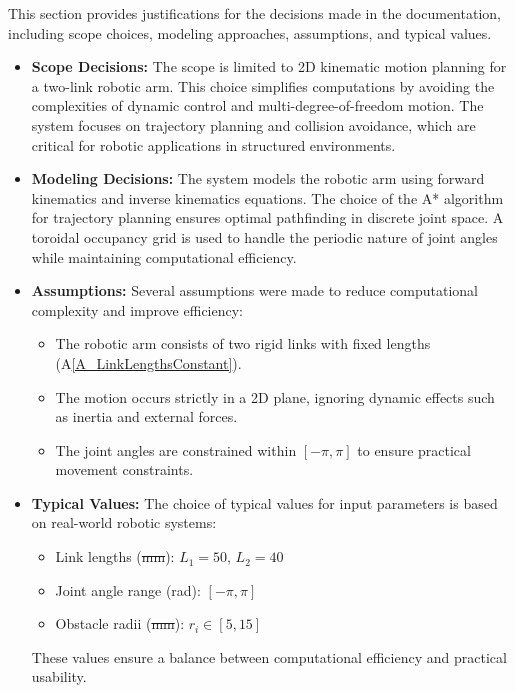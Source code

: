 \documentclass[12pt]{article}
\makeatletter
\newcommand{\aref}[1]{A\ref{#1}}
\providecommand{\DIFaddtex}[1]{{\protect\color{blue}\uwave{#1}}} %
\providecommand{\DIFdeltex}[1]{{\protect\color{red}\sout{#1}}} %
\providecommand{\DIFaddbegin}{} %
\providecommand{\DIFaddend}{} %
\providecommand{\DIFdelbegin}{} %
\providecommand{\DIFdelend}{} %
\providecommand{\DIFadd}[1]{\texorpdfstring{\DIFaddtex{#1}}{#1}} %
\providecommand{\DIFdel}[1]{\texorpdfstring{\DIFdeltex{#1}}{}} %
\newcommand{\DIFscaledelfig}{0.5}
\newlength{\DIFdelgraphicswidth} %
\newlength{\DIFdelgraphicsheight} %
\newcommand{\DIFaddincludegraphics}[2][]{{\color{blue}\fbox{\DIFOincludegraphics[#1]{#2}}}} %
\newcommand{\DIFdelincludegraphics}[2][]{%
\sbox{\DIFdelgraphicsbox}{\DIFOincludegraphics[#1]{#2}}%
\settoboxwidth{\DIFdelgraphicswidth}{\DIFdelgraphicsbox} %
\settoboxtotalheight{\DIFdelgraphicsheight}{\DIFdelgraphicsbox} %
\scalebox{\DIFscaledelfig}{%
\parbox[b]{\DIFdelgraphicswidth}{\usebox{\DIFdelgraphicsbox}\\[-\baselineskip] \rule{\DIFdelgraphicswidth}{0em}}\llap{\resizebox{\DIFdelgraphicswidth}{\DIFdelgraphicsheight}{%
\setlength{\unitlength}{\DIFdelgraphicswidth}%
\begin{picture}(1,1)%
\thicklines\linethickness{2pt} %
{\color[rgb]{1,0,0}\put(0,0){\framebox(1,1){}}}%
{\color[rgb]{1,0,0}\put(0,0){\line( 1,1){1}}}%
{\color[rgb]{1,0,0}\put(0,1){\line(1,-1){1}}}%
\end{picture}%
}\hspace*{3pt}}} %
} %
\DeclareRobustCommand{\DIFaddbegin}{\DIFOaddbegin \let\includegraphics\DIFaddincludegraphics} %
\DeclareRobustCommand{\DIFaddend}{\DIFOaddend \let\includegraphics\DIFOincludegraphics} %
\DeclareRobustCommand{\DIFdelbegin}{\DIFOdelbegin \let\includegraphics\DIFdelincludegraphics} %
\DeclareRobustCommand{\DIFdelend}{\DIFOaddend \let\includegraphics\DIFOincludegraphics} %
\let\sout@orig\sout %
\renewcommand{\sout}[1]{\ifmmode\text{\sout@orig{\ensuremath{#1}}}\else\sout@orig{#1}\fi} %
\makeatother
\begin{document}
  This section provides justifications for the decisions made in the documentation, including scope choices, modeling approaches, assumptions, and typical values.

  \noindent \begin{itemize}

  \item \textbf{Scope Decisions:}  
  The scope is limited to 2D kinematic motion planning for a two-link robotic arm. This choice simplifies computations by avoiding the complexities of dynamic control and multi-degree-of-freedom motion. The system focuses on trajectory planning and collision avoidance, which are critical for robotic applications in structured environments.

  \item \textbf{Modeling Decisions:}  
  The system models the robotic arm using forward kinematics and inverse kinematics equations. The choice of the A* algorithm for trajectory planning ensures optimal pathfinding in discrete joint space. A toroidal occupancy grid is used to handle the periodic nature of joint angles while maintaining computational efficiency.

  \item \textbf{Assumptions:}  
  Several assumptions were made to reduce computational complexity and improve efficiency:
    \begin{itemize}
      \item The robotic arm consists of two rigid links with fixed lengths (\aref{A_LinkLengthsConstant}).
      \item The motion occurs strictly in a 2D plane, ignoring dynamic effects such as inertia and external forces.
      \item The joint angles are constrained within \([- \pi, \pi]\) to ensure practical movement constraints.
    \end{itemize}

  \item \textbf{Typical Values:}  
  The choice of typical values for input parameters is based on real-world robotic systems:
    \begin{itemize}
      \item Link lengths (\DIFdelbegin \DIFdel{\si{\milli\metre}}\DIFdelend \DIFaddbegin \DIFadd{\si{\metre}}\DIFaddend ): $L_1 = 50$, $L_2 = 40$ 
      \item Joint angle range (\si{\radian}): $[-\pi, \pi]$
      \item Obstacle radii (\DIFdelbegin \DIFdel{\si{\milli\metre}}\DIFdelend \DIFaddbegin \DIFadd{\si{\metre}}\DIFaddend ): $r_i \in [5, 15]$ 
    \end{itemize}
    These values ensure a balance between computational efficiency and practical usability.

  \end{itemize}
\end{document}
